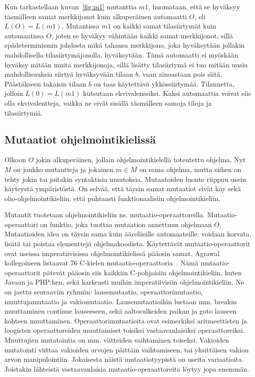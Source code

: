 \documentclass[finnish]{tktltiki2}
\begin{document}
Kun tarkastellaan kuvan~\ref{fig:m1} mutanttia $m1$, huomataan, että se hyväksyy täsmälleen samat merkkijonot kuin alkuperäinen automaatti $O$, eli $L(O) = L(m1)$. Mutantissa $m1$ on kaikki samat tilasiirtymät kuin automaatissa $O$, joten se hyväkyy vähintään kaikki samat merkkijonot, sillä epädeterminismin johdosta mikä tahansa merkkijono, joka hyväksytään jollakin mahdollisella tilasiirtymäjonolla, hyväksytään. Tämä automaatti ei myöskään hyväksy mitään muita merkkijonoja, sillä lisätty tilasiirtymä ei tuo mitään uusia mahdollisuuksia siirtyä hyväksyvään tilaan $b$, vaan ainoastaan pois siitä. Päästäkseen takaisin tilaan $b$ on taas käytettävä ykkössiirtymää. Tilannetta, jolloin $L(0) = L(m1)$ kutsutaan ekvivalenssiksi. Kaksi automaattia voivat siis olla ekvivalentteja, vaikka ne eivät sisällä täsmälleen samoja tiloja ja tilasiirtymiä.
 
\subsection{Mutaatiot ohjelmointikielissä}
Olkoon $O$ jokin alkuperäinen, jollain ohjelmointikielellä toteutettu ohjelma. Nyt $M$ on joukko mutantteja ja jokainen $m\in M$ on sama ohjelma, mutta siihen on tehty jokin tai joitakin syntaktisia muutoksia. Mutaatoiden luonto riippuu usein käyteystä ympäristöstä. On selvää, että täysin samat mutaatiot eivät käy sekä olio-ohjelmointikieliin, että puhtaasti funktionaalisiin ohjelmointikieliin.

Mutantit tuotetaan ohjelmointikieliin ns. mutaatio-operaattoreilla. Mutaatio-operaattori on funktio, joka tuottaa mutaation annettuun ohjelmaan $O$. Mutaatioiden idea on täysin sama kuin äärellisille automaateille: voidaan korvata, lisätä tai poistaa elementtejä ohjelmakoodista. Käytettävät mutaatio-operaattorit ovat useissa imperatiivisissa ohjelmointikielissä pääosin samat. Agrawal kollegoineen listaavat 76 C-kielen mutaatio-operaattoria~\cite{AgrawalDHHHKMMS89}. Nämä mutaatio-operaattorit pätevät pääosin siis kaikkiin C-pohjaisiin ohjelmointikieliin, kuten Javaan ja PHP:hen, sekä karkeasti muihin imperatiivisiin ohjelmointikieliin. Ne on jaettu seuraaviin ryhmiin: lausemutaatio, operaattorimutaatio, muuttujamutaatio ja vakiomutaatio. Lausemutaatioihin luetaan mm. breakin muuttaminen continue lauseeseen, sekä aaltosulkeiden paikan ja goto lauseen kohteen muuttaminen. Operaattorimutaatioita ovat esimerkiksi aritmeettisten ja loogisten operaattoreiden muuttamiset toisiksi vastaavanlaisiksi operaattoreiksi. Muuttujien mutatointia on mm. viitteiden vaihtaminen toiseksi. Vakioiden mutatointi viittaa vakioiden arvojen päittäin vaihtamiseen, tai yksittäisen vakion arvon manipulointiin. Jokaisesta näistä mutaatiotyypistä on useita variaatioita. Joistakin lähteistä vastaavanlaisia mutaatio-operaattoreita löytyy jopa enemmän.
\end{document}
